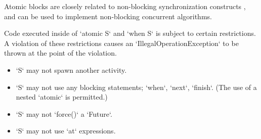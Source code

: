

Atomic blocks are closely related to non-blocking synchronization
constructs \cite{herlihy91waitfree}, and can be used to implement 
non-blocking concurrent algorithms.

Code executed inside of \xcd`atomic S` and \xcd`when S` is subject
to certain restrictions. A violation of these restrictions causes an 
\xcd`IllegalOperationException` to be thrown at the point of the violation.

\begin{itemize}
\item \xcd`S` may not spawn another activity.
\item \xcd`S` may not use any blocking statements; \xcd`when`, \xcd`next`,
      \xcd`finish`.  (The use of a nested \xcd`atomic` is permitted.)
\item \xcd`S` may not \xcd`force()` a \xcd`Future`. 
\item \xcd`S` may not use \xcd`at` expressions.
\end{itemize}



